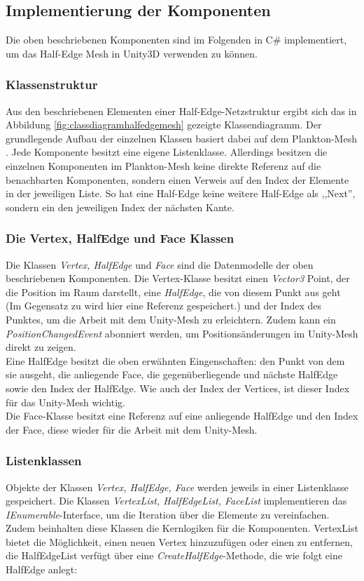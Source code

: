 \subsection{Implementierung der Komponenten}
Die oben beschriebenen Komponenten sind im Folgenden in C\# implementiert, um das Half-Edge Mesh in Unity3D verwenden zu k\"onnen. 

\subsubsection{Klassenstruktur}
Aus den beschriebenen Elementen einer Half-Edge-Netzstruktur ergibt sich das in Abbildung \ref{fig:classdiagramhalfedgemesh} gezeigte Klassendiagramm. Der grundlegende Aufbau der einzelnen Klassen basiert dabei auf dem Plankton-Mesh \cite{Meshmash2017}. Jede Komponente besitzt eine eigene Listenklasse. Allerdings besitzen die einzelnen Komponenten im Plankton-Mesh keine direkte Referenz auf die benachbarten Komponenten, sondern einen Verweis auf den Index der Elemente in der jeweiligen Liste. So hat eine Half-Edge keine weitere Half-Edge als ,,Next'', sondern ein den jeweiligen Index der n\"achsten Kante.

\subsubsection{Die Vertex, HalfEdge und Face Klassen}
Die Klassen \textit{Vertex, HalfEdge} und \textit{Face} sind die Datenmodelle der oben beschriebenen Komponenten. Die Vertex-Klasse besitzt einen \textit{Vector3} Point, der die Position im Raum darstellt, eine \textit{HalfEdge}, die von diesem Punkt aus geht (Im Gegensatz zu \cite{Meshmash2017} wird hier eine Referenz gespeichert.) und der Index des Punktes, um die Arbeit mit dem Unity-Mesh zu erleichtern. Zudem kann ein \textit{PositionChangedEvent} abonniert werden, um Positions\"anderungen im Unity-Mesh direkt zu zeigen.
\\
Eine HalfEdge besitzt die oben erw\"ahnten Eingenschaften: den Punkt von dem sie ausgeht, die anliegende Face, die gegen\"uberliegende und n\"achste HalfEdge sowie den Index der HalfEdge. Wie auch der Index der Vertices, ist dieser Index f\"ur das Unity-Mesh wichtig.
\\
Die Face-Klasse besitzt eine Referenz auf eine anliegende HalfEdge und den Index der Face, diese wieder f\"ur die Arbeit mit dem Unity-Mesh.

\subsubsection{Listenklassen}
Objekte der Klassen \textit{Vertex, HalfEdge, Face} werden jeweils in einer Listenklasse gespeichert. Die Klassen \textit{VertexList, HalfEdgeList, FaceList} implementieren das \textit{IEnumerable}-Interface, um die Iteration \"uber die Elemente zu vereinfachen. Zudem beinhalten diese Klassen die Kernlogiken f\"ur die Komponenten. VertexList bietet die M\"oglichkeit, einen neuen Vertex hinzuzuf\"ugen oder einen zu entfernen, die HalfEdgeList verf\"ugt \"uber eine  \textit{CreateHalfEdge}-Methode, die wie folgt eine HalfEdge anlegt:

